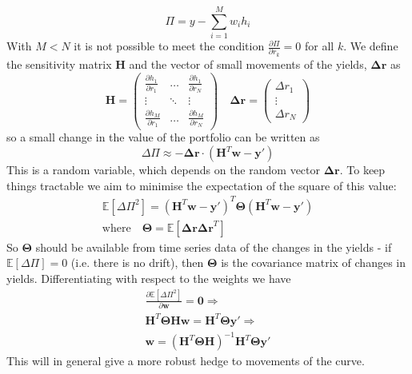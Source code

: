 %
\begin{equation}
\Pi = y-\sum^M_{i=1}w_ih_i
\end{equation}
%
With $M<N$ it is not possible to meet the condition $\frac{\partial \Pi}{\partial r_k}=0$ for all $k$. We define the sensitivity matrix $\mathbf{H}$ and the vector of small movements of the yields, $\mathbf{\Delta r}$ as
\begin{equation}
\mathbf{H} = \left(  
\begin{array}{ccc}
\frac{\partial h_{1}}{\partial r_1} & \ldots & \frac{\partial h_1}{\partial r_N}\\
\vdots&\ddots&\vdots\\
\frac{\partial h_M}{\partial r_1}&\ldots&\frac{\partial h_M}{\partial r_N}
\end{array}
\right)
\quad
\mathbf{\Delta r} = \left(  
\begin{array}{c}
\Delta r_1\\
\vdots\\
\Delta r_N
\end{array}
\right)
\end{equation}
%
so a small change in the value of the portfolio can be written as
\begin{equation}
\Delta \Pi \approx - \mathbf{\Delta r} \cdot (\mathbf{H}^T\mathbf{w}-\mathbf{y}')
\end{equation}
This is a random variable, which depends on the random vector $\mathbf{\Delta r}$. To keep things tractable we aim to minimise the expectation of the square of this value:
\begin{equation}
\begin{split}
\mathbb{E}[\Delta \Pi^2] = (\mathbf{H}^T\mathbf{w}-\mathbf{y}')^T \mathbf{\Theta} (\mathbf{H}^T\mathbf{w}-\mathbf{y}')\\
\text{where}  \quad\mathbf{\Theta}  = \mathbb{E}[ \mathbf{\Delta r} \mathbf{\Delta r}^T]
\end{split}
\end{equation}
So $\mathbf{\Theta}$ should be available from time series data of the changes in the yields - if $\mathbb{E}[\Delta \Pi]=0$ (i.e. there is no drift), then $\mathbf{\Theta}$ is the covariance matrix of changes in yields. Differentiating with respect to the weights we have
\begin{equation}
\begin{split}
\frac{\partial \mathbb{E}[\Delta \Pi^2]}{\partial \mathbf{w}} = \mathbf{0} \Rightarrow\\
 \mathbf{H}^T\mathbf{\Theta} \mathbf{H} \mathbf{w}= \mathbf{H}^T\mathbf{\Theta}\mathbf{y}' \Rightarrow\\
 \mathbf{w}=( \mathbf{H}^T\mathbf{\Theta} \mathbf{H} )^{-1} \mathbf{H}^T\mathbf{\Theta}\mathbf{y}' 
\end{split}
\end{equation}
This will in general give a more robust hedge to movements of the curve.

